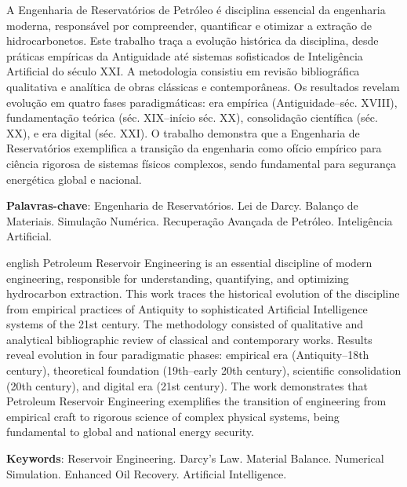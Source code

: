 \documentclass[12pt,a4paper,oneside,brazilian,sumario=tradicional]{abntex2}
\begin{document}
\setlength{\absparsep}{18pt}
\begin{resumo}
A Engenharia de Reservatórios de Petróleo é disciplina essencial da engenharia moderna, responsável por compreender, quantificar e otimizar a extração de hidrocarbonetos. Este trabalho traça a evolução histórica da disciplina, desde práticas empíricas da Antiguidade até sistemas sofisticados de Inteligência Artificial do século XXI. A metodologia consistiu em revisão bibliográfica qualitativa e analítica de obras clássicas e contemporâneas. Os resultados revelam evolução em quatro fases paradigmáticas: era empírica (Antiguidade--séc. XVIII), fundamentação teórica (séc. XIX--início séc. XX), consolidação científica (séc. XX), e era digital (séc. XXI). O trabalho demonstra que a Engenharia de Reservatórios exemplifica a transição da engenharia como ofício empírico para ciência rigorosa de sistemas físicos complexos, sendo fundamental para segurança energética global e nacional.

\vspace{\onelineskip}
\noindent
\textbf{Palavras-chave}: Engenharia de Reservatórios. Lei de Darcy. Balanço de Materiais. Simulação Numérica. Recuperação Avançada de Petróleo. Inteligência Artificial.
\end{resumo}

\begin{resumo}[Abstract]
\begin{otherlanguage*}{english}
Petroleum Reservoir Engineering is an essential discipline of modern engineering, responsible for understanding, quantifying, and optimizing hydrocarbon extraction. This work traces the historical evolution of the discipline from empirical practices of Antiquity to sophisticated Artificial Intelligence systems of the 21st century. The methodology consisted of qualitative and analytical bibliographic review of classical and contemporary works. Results reveal evolution in four paradigmatic phases: empirical era (Antiquity--18th century), theoretical foundation (19th--early 20th century), scientific consolidation (20th century), and digital era (21st century). The work demonstrates that Petroleum Reservoir Engineering exemplifies the transition of engineering from empirical craft to rigorous science of complex physical systems, being fundamental to global and national energy security.

\vspace{\onelineskip}
\noindent
\textbf{Keywords}: Reservoir Engineering. Darcy's Law. Material Balance. Numerical Simulation. Enhanced Oil Recovery. Artificial Intelligence.
\end{otherlanguage*}
\end{resumo}
\end{document}
